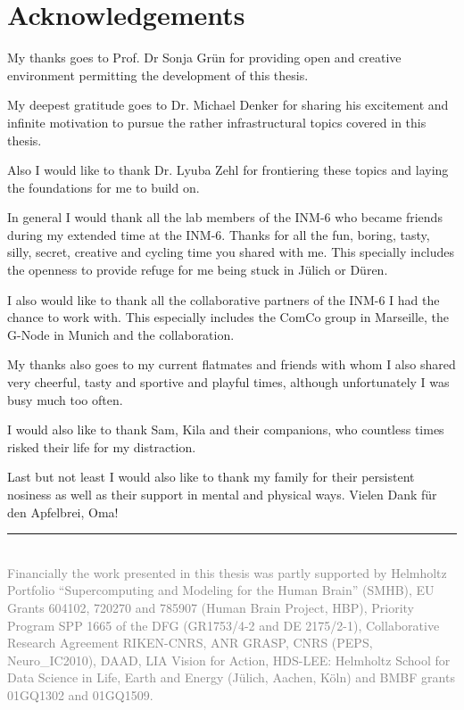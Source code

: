 \cleardoublepage
\pagestyle{plain}
\section*{Acknowledgements}

My thanks goes to Prof. Dr Sonja Grün for providing open and creative environment permitting the development of this thesis.\newline

My deepest gratitude goes to Dr. Michael Denker for sharing his excitement and infinite motivation to pursue the rather infrastructural topics covered in this thesis.\newline

Also I would like to thank Dr. Lyuba Zehl for frontiering these topics and laying the foundations for me to build on.\newline

In general I would thank all the lab members of the INM-6 who became friends during my extended time at the INM-6. Thanks for all the fun, boring, tasty, silly, secret, creative and cycling time you shared with me. This specially includes the openness to provide refuge for me being stuck in Jülich or Düren.\newline

I also would like to thank all the collaborative partners of the INM-6 I had the chance to work with. This especially includes the ComCo group in Marseille, the G-Node in Munich and the  collaboration.\newline

My thanks also goes to my current flatmates and friends with whom I also shared very cheerful, tasty and sportive and playful times, although unfortunately I was busy much too often.\newline

I would also like to thank Sam, Kila and their companions, who countless times risked their life for my distraction.
\newline

Last but not least I would also like to thank my family for their persistent nosiness as well as their support in mental and physical ways. Vielen Dank für den Apfelbrei, Oma!\newline

\vfill
\textcolor{gray}{\rule{0.3\textwidth}{0.4pt}\\
\smaller
Financially the work presented in this thesis was partly supported by Helmholtz Portfolio “Supercomputing and Modeling for the Human Brain” (SMHB), EU Grants 604102, 720270 and 785907 (Human Brain Project, HBP), Priority Program SPP 1665 of the DFG (GR1753/4-2 and DE 2175/2-1), Collaborative Research Agreement RIKEN-CNRS, ANR GRASP, CNRS (PEPS, Neuro\_IC2010), DAAD, LIA Vision for Action, HDS-LEE: Helmholtz School for Data Science in Life, Earth and Energy (Jülich, Aachen, Köln) and BMBF grants 01GQ1302 and 01GQ1509.}
